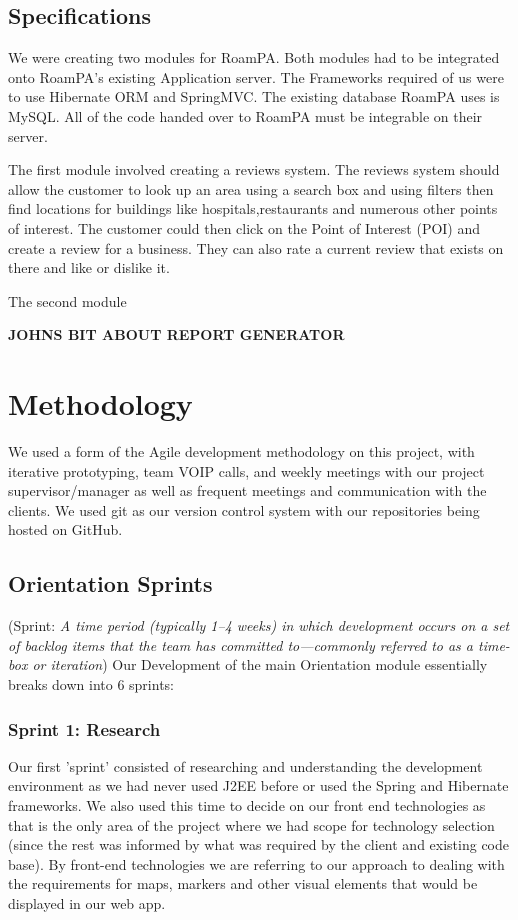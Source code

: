 \section{Specifications}

We were creating two modules for RoamPA. Both modules had to be integrated onto RoamPA's existing Application server. The Frameworks required of us were to use Hibernate ORM and SpringMVC. The existing database RoamPA uses is MySQL. All of the code handed over to RoamPA must be integrable on their server.

The first module involved creating a reviews system. The reviews system should allow the customer to look up an area using a search box and using filters then find locations for buildings like hospitals,restaurants and numerous other points of interest. The customer could then click on the Point of Interest (POI) and create a review for a business. They can also rate a current review that exists on there and like or dislike it.

The second module \newline

\textbf{JOHNS BIT ABOUT REPORT GENERATOR}


\chapter{Methodology}
We used a form of the Agile development methodology on this project, with iterative prototyping, team VOIP calls, and weekly meetings with our project supervisor/manager as well as frequent meetings and communication with the clients. We used git as our version control system with our repositories being hosted on GitHub.

\section{Orientation Sprints}
(Sprint: \emph{A time period (typically 1–4 weeks) in which development occurs on a set of backlog items that the team has committed to—commonly referred to as a time-box or iteration}) 
Our Development of the main Orientation module essentially breaks down into 6 sprints:

\subsection{Sprint  1: Research}
Our first 'sprint' consisted of researching and understanding the development environment as we had never used J2EE before or used the Spring and Hibernate frameworks. We also used this time to decide on our front end technologies as that is the only area of the project where we had scope for technology selection (since the rest was informed by what was required by the client and existing code base). By front-end technologies we are referring to our approach to dealing with the requirements for maps, markers and other visual elements that would be displayed in our web app.\newline

